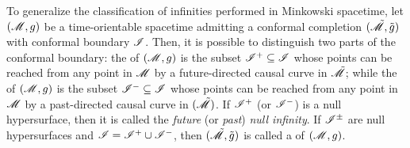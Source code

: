 To generalize the classification of infinities performed in Minkowski spacetime, let $ (\mathscr{M} , g) $ be a time-orientable spacetime admitting a conformal completion $ (\tilde{\mathscr{M}} , \tilde{g}) $ with conformal boundary $ \mathscr{I} $. Then, it is possible to distinguish two parts of the conformal boundary: the  of $ (\mathscr{M} , g) $ is the subset $ \mathscr{I}^+ \subseteq \mathscr{I} $ whose points can be reached from any point in $ \mathscr{M} $ by a future-directed causal curve in $ \tilde{\mathscr{M}} $; while the  of $ (\mathscr{M} , g) $ is the subset $ \mathscr{I}^- \subseteq \mathscr{I} $ whose points can be reached from any point in $ \mathscr{M} $ by a past-directed causal curve in $ (\tilde{\mathscr{M}}) $. If $ \mathscr{I}^+ $ (or $ \mathscr{I}^- $) is a null hypersurface, then it is called the \emph{future} (or \emph{past}) \emph{null infinity}. If $ \mathscr{I}^\pm $ are null hypersurfaces and $ \mathscr{I} = \mathscr{I}^+ \cup \mathscr{I}^- $, then $ (\tilde{\mathscr{M}} , \tilde{g}) $ is called a  of $ (\mathscr{M} , g) $.

